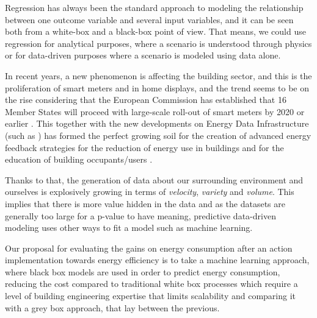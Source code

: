 \documentclass[10pt, conference, compsocconf]{IEEEtran}
\begin{document}

Regression has always been the standard approach to modeling the relationship between one outcome variable  and several input variables, and it can be seen both from a white-box and a black-box point of view. That means, we could use regression for analytical purposes, where a scenario is understood through physics or for data-driven purposes where a scenario is modeled using data alone. 


In recent years, a new phenomenon is affecting the building sector, and this is the proliferation of smart meters and in home displays, and the trend seems to be on the rise considering that the European Commission has established that 16 Member States will proceed with large-scale roll-out of smart meters by 2020 or earlier \cite{ec2014report}. This together with the new developments on Energy Data Infrastructure (such as \cite{terroso2017open}) has formed the perfect growing soil for the creation of advanced energy feedback strategies for the reduction of energy use in buildings and for the education of building occupants/users \cite{how2017}.

Thanks to that, the generation of data about our surrounding environment and ourselves is explosively growing in terms of \emph{velocity}, \emph{variety} and \emph{volume}. This implies that there is more value hidden in the data and as the datasets are generally too large for a p-value to have meaning, predictive data-driven modeling uses other ways to fit a model such as machine learning.




Our proposal for evaluating the gains on energy consumption after an action implementation towards energy efficiency is to take a machine learning approach, where black box models are used in order to predict energy consumption, reducing the cost compared to traditional white box processes which require a level of building engineering expertise that limits scalability and comparing it with a grey box approach, that lay between the previous.
\end{document}
